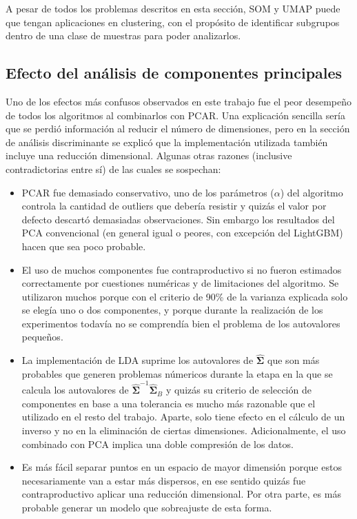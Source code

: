 \documentclass[12pt]{article}
\begin{document}
A pesar de todos los problemas descritos en esta sección, SOM y UMAP puede que tengan aplicaciones en clustering, con el propósito de identificar subgrupos dentro de una clase de muestras para poder analizarlos.

\subsection{Efecto del análisis de componentes principales}

Uno de los efectos más confusos observados en este trabajo fue el peor desempeño de todos los algoritmos al combinarlos con PCAR. Una explicación sencilla sería que se perdió información al reducir el número de dimensiones, pero en la sección de análisis discriminante se explicó que la implementación utilizada también incluye una reducción dimensional. Algunas otras razones (inclusive contradictorias entre sí) de las cuales se sospechan:

\begin{itemize}
    \item PCAR fue demasiado conservativo, uno de los parámetros ($\alpha$) del algoritmo controla la cantidad de outliers que debería resistir y quizás el valor por defecto descartó demasiadas observaciones. Sin embargo los resultados del PCA convencional (en general igual o peores, con excepción del LightGBM) hacen que sea poco probable.
    \item El uso de muchos componentes fue contraproductivo si no fueron estimados correctamente por cuestiones numéricas y de limitaciones del algoritmo. Se utilizaron muchos porque con el criterio de 90\% de la varianza explicada solo se elegía uno o dos componentes, y porque durante la realización de los experimentos todavía no se comprendía bien el problema de los autovalores pequeños. 
    \item La implementación de LDA suprime los autovalores de $\hat{\boldsymbol{\Sigma}}$ que son más probables que generen problemas númericos durante la etapa en la que se calcula los autovalores de $\hat{\boldsymbol{\Sigma}}^{-1}\hat{\boldsymbol{\Sigma}}_B$ y quizás su criterio de selección de componentes en base a una tolerancia es mucho más razonable que el utilizado en el resto del trabajo. Aparte, solo tiene efecto en el cálculo de un inverso y no en la eliminación de ciertas dimensiones. Adicionalmente, el uso combinado con PCA implica una doble compresión de los datos.
    \item Es más fácil separar puntos en un espacio de mayor dimensión porque estos necesariamente van a estar más dispersos, en ese sentido quizás fue contraproductivo aplicar una reducción dimensional. Por otra parte, es más probable generar un modelo que sobreajuste de esta forma.
\end{itemize}
\end{document}
